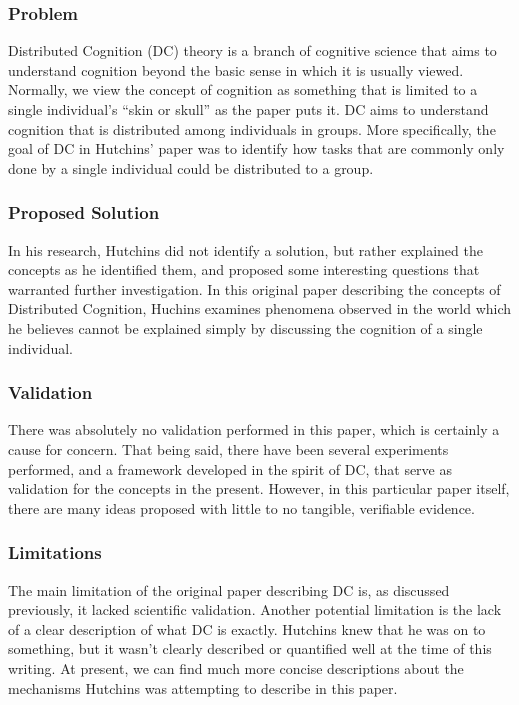\subsubsection{Problem}
Distributed Cognition (DC) theory is a branch of cognitive science that aims to understand cognition beyond the basic sense in which it is usually viewed. Normally, we view the concept of cognition as something that is limited to a single individual's ``skin or skull'' as the paper puts it. DC aims to understand cognition that is distributed among individuals in groups. More specifically, the goal of DC in Hutchins' paper was to identify how tasks that are commonly only done by a single individual could be distributed to a group.

\subsubsection{Proposed Solution}
In his research, Hutchins did not identify a solution, but rather explained the concepts as he identified them, and proposed some interesting questions that warranted further investigation. In this original paper describing the concepts of Distributed Cognition, Huchins examines phenomena observed in the world which he believes cannot be explained simply by discussing the cognition of a single individual.

\subsubsection{Validation}
There was absolutely no validation performed in this paper, which is certainly a cause for concern. That being said, there have been several experiments performed, and a framework developed in the spirit of DC, that serve as validation for the concepts in the present. However, in this particular paper itself, there are many ideas proposed with little to no tangible, verifiable evidence.

\subsubsection{Limitations}
The main limitation of the original paper describing DC is, as discussed previously, it lacked scientific validation. Another potential limitation is the lack of a clear description of what DC is exactly. Hutchins knew that he was on to something, but it wasn't clearly described or quantified well at the time of this writing. At present, we can find much more concise descriptions about the mechanisms Hutchins was attempting to describe in this paper.
